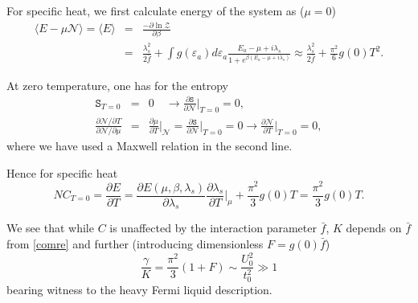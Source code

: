 \documentclass[twocolumn,floatfix,superscriptaddress]{revtex4-1}
\newcommand{\ket}{\rangle}
\newcommand{\bra}{\langle}
\begin{document}
\begin{widetext}
For specific heat, we first calculate energy of the system as ($\mu=0$)
\begin{eqnarray}
\bra E-\mu\mathcal N\ket =\bra E\ket&=&\frac{-\partial \ln \mathcal Z}{\partial \beta}\nonumber\\
&=&\frac{\lambda_s^2}{2\bar f}+\int g(\varepsilon_a) d\varepsilon_a \frac{E_a-\mu+i\lambda_s}{1+e^{\beta (E_a-\mu+i\lambda_s)}}\approx \frac{\lambda_s^2}{2\bar f}+\frac{\pi^2}{6} g(0) T^2.
\end{eqnarray}

At zero temperature, one has for the entropy 
\begin{eqnarray}
\mathtt S_{T=0}&=&0\quad\rightarrow \frac{\partial \mathtt S}{\partial \mathcal N}\Big|_{T=0}=0,\nonumber\\
\frac{\partial \mathcal N/\partial T}{\partial\mathcal N/\partial \mu}&=&\frac{\partial \mu}{\partial T}\Big|_{\mathcal N}= \frac{\partial \mathtt S}{\partial \mathcal N}\Big |_{T=0}=0\rightarrow \frac{\partial\mathcal N}{\partial T}\Big|_{T=0}=0,
\end{eqnarray}
where we have used a Maxwell relation in the second line.

Hence for specific heat
\begin{equation}
NC_{T=0}=\frac{\partial E}{\partial T}=\frac{\partial E(\mu,\beta,\lambda_s)}{\partial \lambda_s}\frac{\partial \lambda_s}{\partial T}\Big |_\mu+\frac{\pi^2}{3}g(0) T=\frac{\pi^2}{3}g(0) T.
\end{equation}

We see that while $C$ is unaffected by the interaction parameter $\bar f$, $K$ depends on $\bar f$ from \eqref{comre} and further  (introducing dimensionless $F=g(0)\bar f$)
\begin{equation}
\frac{\gamma}{K}=\frac{\pi^2}{3}(1+F)\sim \frac{U_0^2}{t_0^2}\gg 1
\end{equation}
bearing witness to the heavy Fermi liquid description.


\end{widetext}
\end{document}
